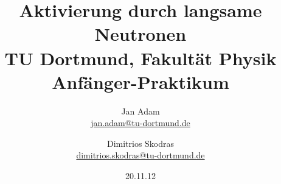 

\usepackage{float}
\usepackage{caption}



\title{Aktivierung durch langsame Neutronen\\				%
\large TU Dortmund, Fakultät Physik\\ 
\normalsize Anfänger-Praktikum}

\author{Jan Adam\\			%
{\small \href{jan.adam@tu-dortmund.de}{jan.adam@tu-dortmund.de}}	%
\and						%
Dimitrios Skodras\\			%
{\small \href{dimitrios.skodras@tu-dortmund.de}{dimitrios.skodras@tu-dortmund.de}}		%
}
\date{20.11.12}					%





\maketitle					%
\thispagestyle{empty} 				%



\tableofcontents


\newpage					%


